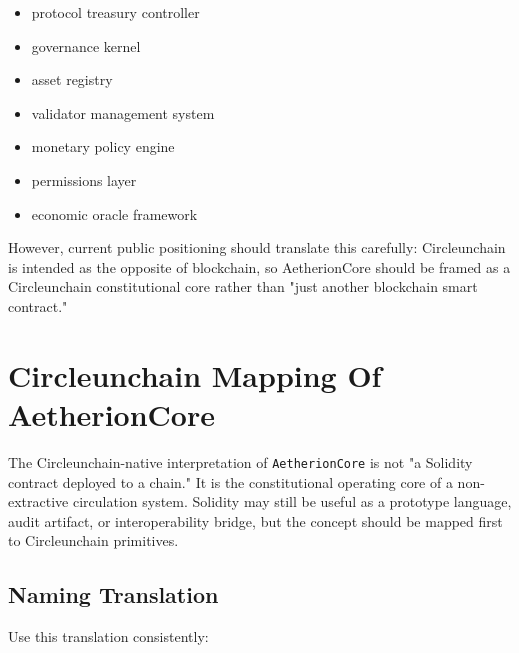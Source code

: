 ﻿\documentclass[12pt]{article}
\begin{document}
\begin{itemize}
  \item protocol treasury controller
\end{itemize}
\begin{itemize}
  \item governance kernel
\end{itemize}
\begin{itemize}
  \item asset registry
\end{itemize}
\begin{itemize}
  \item validator management system
\end{itemize}
\begin{itemize}
  \item monetary policy engine
\end{itemize}
\begin{itemize}
  \item permissions layer
\end{itemize}
\begin{itemize}
  \item economic oracle framework
\end{itemize}

However, current public positioning should translate this carefully: Circleunchain is intended as the opposite of blockchain, so AetherionCore should be framed as a Circleunchain constitutional core rather than "just another blockchain smart contract."

\section{Circleunchain Mapping Of AetherionCore}


The Circleunchain-native interpretation of \texttt{AetherionCore} is not "a Solidity contract deployed to a chain." It is the constitutional operating core of a non-extractive circulation system. Solidity may still be useful as a prototype language, audit artifact, or interoperability bridge, but the concept should be mapped first to Circleunchain primitives.

\subsection{Naming Translation}


Use this translation consistently:
\end{document}
